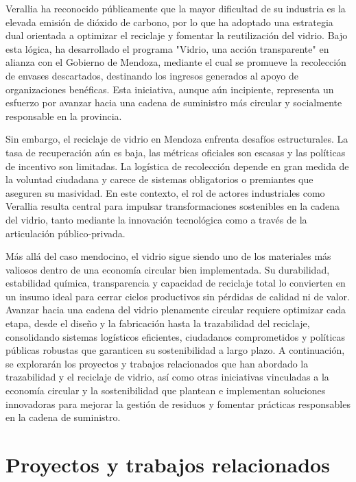 Verallia ha reconocido públicamente que la mayor dificultad de su industria es la elevada emisión de dióxido de carbono, por lo que ha adoptado una estrategia dual orientada a optimizar el reciclaje y fomentar la reutilización del vidrio. Bajo esta lógica, ha desarrollado el programa "Vidrio, una acción transparente" en alianza con el Gobierno de Mendoza, mediante el cual se promueve la recolección de envases descartados, destinando los ingresos generados al apoyo de organizaciones benéficas. Esta iniciativa, aunque aún incipiente, representa un esfuerzo por avanzar hacia una cadena de suministro más circular y socialmente responsable en la provincia.

Sin embargo, el reciclaje de vidrio en Mendoza enfrenta desafíos estructurales. La tasa de recuperación aún es baja, las métricas oficiales son escasas y las políticas de incentivo son limitadas. La logística de recolección depende en gran medida de la voluntad ciudadana y carece de sistemas obligatorios o premiantes que aseguren su masividad. En este contexto, el rol de actores industriales como Verallia resulta central para impulsar transformaciones sostenibles en la cadena del vidrio, tanto mediante la innovación tecnológica como a través de la articulación público-privada.

Más allá del caso mendocino, el vidrio sigue siendo uno de los materiales más valiosos dentro de una economía circular bien implementada. Su durabilidad, estabilidad química, transparencia y capacidad de reciclaje total lo convierten en un insumo ideal para cerrar ciclos productivos sin pérdidas de calidad ni de valor. Avanzar hacia una cadena del vidrio plenamente circular requiere optimizar cada etapa, desde el diseño y la fabricación hasta la trazabilidad del reciclaje, consolidando sistemas logísticos eficientes, ciudadanos comprometidos y políticas públicas robustas que garanticen su sostenibilidad a largo plazo. A continuación, se explorarán los proyectos y trabajos relacionados que han abordado la trazabilidad y el reciclaje de vidrio, así como otras iniciativas vinculadas a la economía circular y la sostenibilidad que plantean e implementan soluciones innovadoras para mejorar la gestión de residuos y fomentar prácticas responsables en la cadena de suministro.

\section{Proyectos y trabajos relacionados}


